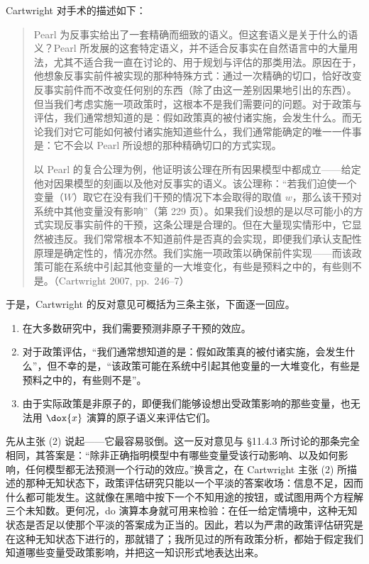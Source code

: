 Cartwright 对手术的描述如下：

\begin{quote}\kaishu
Pearl 为反事实给出了一套精确而细致的语义。但这套语义是关于什么的语义？Pearl 所发展的这套特定语义，并不适合反事实在自然语言中的大量用法，尤其不适合我一直在讨论的、用于规划与评估的那类用法。原因在于，他想象反事实前件被实现的那种特殊方式：通过一次精确的切口，恰好改变反事实前件而不改变任何别的东西（除了由这一差别因果地引出的东西）。但当我们考虑实施一项政策时，这根本不是我们需要问的问题。对于政策与评估，我们通常想知道的是：假如政策真的被付诸实施，会发生什么。而无论我们对它可能如何被付诸实施知道些什么，我们通常能确定的唯一一件事是：它不会以 Pearl 所设想的那种精确切口的方式实现。

以 Pearl 的复合公理为例，他证明该公理在所有因果模型中都成立——给定他对因果模型的刻画以及他对反事实的语义。该公理称：“若我们迫使一个变量（$W$）取它在没有我们干预的情况下本会取得的取值 $w$，那么该干预对系统中其他变量没有影响”（第 229 页）。如果我们设想的是以尽可能小的方式实现反事实前件的干预，这条公理是合理的。但在大量现实情形中，它显然被违反。我们常常根本不知道前件是否真的会实现，即便我们承认支配性原理是确定性的，情况亦然。我们实施一项政策以确保前件实现——而该政策可能在系统中引起其他变量的一大堆变化，有些是预料之中的，有些则不是。（Cartwright 2007, pp.~246--7）
\end{quote}

于是，Cartwright 的反对意见可概括为三条主张，下面逐一回应。

\begin{enumerate}[label=\arabic*.,leftmargin=1.8em]
\item 在大多数研究中，我们需要预测非原子干预的效应。
\item 对于政策评估，“我们通常想知道的是：假如政策真的被付诸实施，会发生什么”，但不幸的是，“该政策可能在系统中引起其他变量的一大堆变化，有些是预料之中的，有些则不是”。
\item 由于实际政策是非原子的，即便我们能够设想出受政策影响的那些变量，也无法用 $\dox{x}$ 演算的原子语义来评估它们。
\end{enumerate}

先从主张 (2) 说起——它最容易驳倒。这一反对意见与 \S11.4.3 所讨论的那条完全相同，其答案是：“除非正确指明模型中有哪些变量受该行动影响、以及如何影响，任何模型都无法预测一个行动的效应。”换言之，在 Cartwright 主张 (2) 所描述的那种无知状态下，政策评估研究只能以一个平淡的答案收场：信息不足，因而什么都可能发生。这就像在黑暗中按下一个不知用途的按钮，或试图用两个方程解三个未知数。更何况，do 演算本身就可用来检验：在任一给定情境中，这种无知状态是否足以使那个平淡的答案成为正当的。因此，若以为严肃的政策评估研究是在这种无知状态下进行的，那就错了；我所见过的所有政策分析，都始于假定我们知道哪些变量受政策影响，并把这一知识形式地表达出来。

